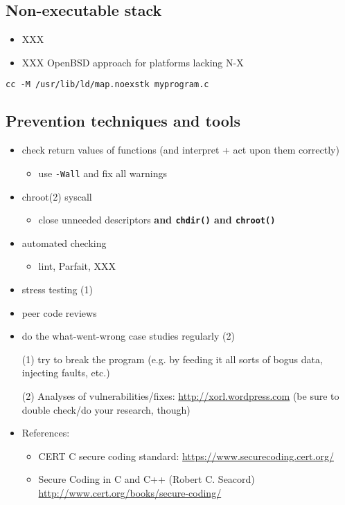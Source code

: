 \subsection{Non-executable stack}

\begin{itemize}
\item XXX
\item XXX OpenBSD approach for platforms lacking N-X
\end{itemize}

\texttt{cc -M /usr/lib/ld/map.noexstk myprogram.c}




\subsection{Prevention techniques and tools}

\begin{itemize}
\item check return values of functions (and interpret + act upon them correctly)
  \begin{itemize}
    \item use \texttt{-Wall} and fix all warnings
  \end{itemize}
\item chroot(2) syscall
  \begin{itemize}
  \item close unneeded descriptors \bf{and} \texttt{chdir()} \bf{and}
   \texttt{chroot()}
  \end{itemize}
\item automated checking
  \begin{itemize}
  \item lint, Parfait, XXX
  \end{itemize}
\item stress testing (1)
\item peer code reviews
\item do the what-went-wrong case studies regularly (2)
\end{itemize}


\begin{itemize}
  \item[(1)] try to break the program (e.g. by feeding it all sorts of bogus
   data, injecting faults, etc.)
  \item[(2)] Analyses of vulnerabilities/fixes: \url{http://xorl.wordpress.com}
    (be sure to double check/do your research, though)
  \item References:
  \begin{itemize}
    \item CERT C secure coding standard:
      \url{https://www.securecoding.cert.org/}
    \item Secure Coding in C and C++ (Robert C. Seacord)
      \url{http://www.cert.org/books/secure-coding/}
  \end{itemize}
\end{itemize}

\endinput
